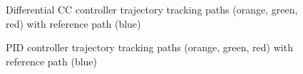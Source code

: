 \begin{figure}[p]
    \centering
    \caption{Differential CC controller trajectory tracking paths (orange, green, red) with reference path (blue)}
    \label{fig:diff_cc_traj_track}
\end{figure}

\begin{figure}[p]
    \centering
    \caption{PID controller trajectory tracking paths (orange, green, red) with reference path (blue)}
    \label{fig:pid_traj_track}
\end{figure}

